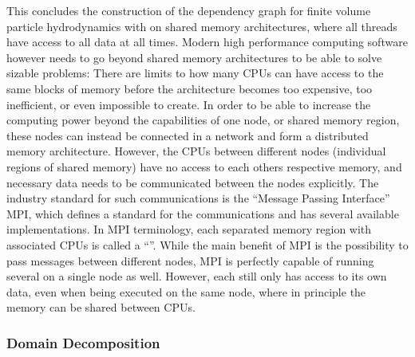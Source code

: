 This concludes the construction of the dependency graph for finite volume particle hydrodynamics
with \swift on shared memory architectures, where all threads have access to all data at all times.
Modern high performance computing software however needs to go beyond shared memory architectures to
be able to solve sizable problems: There are limits to how many CPUs can have access to the same
blocks of memory before the architecture becomes too expensive, too inefficient, or even impossible
to create. In order to be able to increase the computing power beyond the capabilities of one node,
or shared memory region, these nodes can instead be connected in a network and form a distributed
memory architecture. However, the CPUs between different nodes (individual regions of shared
memory) have no access to each others respective memory, and necessary data needs to be communicated
between the nodes explicitly. The industry standard for such communications is the ``Message
Passing Interface'' MPI, which defines a standard for the communications and has several available
implementations. In MPI terminology, each separated memory region with associated CPUs is called a
``''. While the main benefit of MPI is the possibility to pass messages between
different nodes, MPI is perfectly capable of running several  on a single node as
well. However, each  still only has access to its own data, even when being executed on
the same node, where in principle the memory can be shared between CPUs.






\subsubsection{Domain Decomposition}

